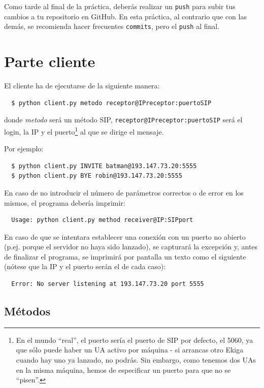 \documentclass[a4paper,11pt]{article}
\begin{document}
  Como tarde al final de la práctica, deberás realizar un \texttt{push} para subir tus cambios a tu repositorio en GitHub. En esta práctica, al contrario que con las demás, se recomienda hacer frecuentes \texttt{commits}, pero el \texttt{push} al final.


\section*{Parte cliente}

El cliente ha de ejecutarse de la siguiente manera:
\begin{verbatim}
  $ python client.py metodo receptor@IPreceptor:puertoSIP
\end{verbatim}

donde \emph{metodo} será un método SIP, \texttt{receptor@IPreceptor:puertoSIP}
será el login, la IP y el puerto\footnote{En el mundo ``real'', el puerto sería 
el puerto de SIP por defecto, el 5060, ya que sólo puede haber un UA activo
por máquina - si arrancas otro Ekiga cuando hay uno ya lanzado, no podrás.
Sin embargo, como tenemos dos UAs en la
misma máquina, hemos de especificar un puerto para que no se ``pisen''.}
al que se dirige el mensaje.

Por ejemplo:
\begin{verbatim}
  $ python client.py INVITE batman@193.147.73.20:5555
  $ python client.py BYE robin@193.147.73.20:5555
\end{verbatim}

En caso de no introducir el número de parámetros correctos o de error en los mismos, el programa debería imprimir:
\begin{verbatim}
  Usage: python client.py method receiver@IP:SIPport
\end{verbatim}

En caso de que se intentara establecer una conexión con un puerto no abierto
(p.ej. porque el servidor no haya sido lanzado), se capturará la excepción y, antes de finalizar el programa, se imprimirá por pantalla un texto como el siguiente 
(nótese que la IP y el puerto serán el de cada caso):
\begin{verbatim}
  Error: No server listening at 193.147.73.20 port 5555
\end{verbatim}

\subsection*{Métodos}
\end{document}

